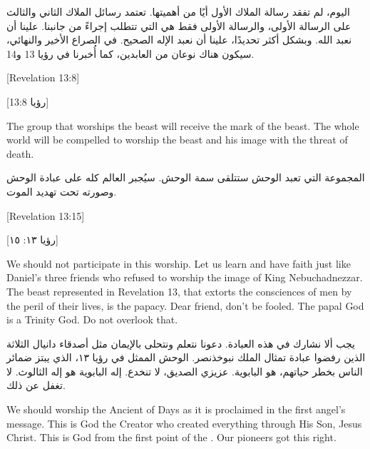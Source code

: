 اليوم، لم تفقد رسالة الملاك الأول أيًا من أهميتها. تعتمد رسائل الملاك الثاني والثالث على الرسالة الأولى، والرسالة الأولى فقط هي التي تتطلب إجراءً من جانبنا. علينا أن نعبد الله. وبشكل أكثر تحديدًا، علينا أن نعبد الإله الصحيح. في الصراع الأخير والنهائي، سيكون هناك نوعان من العابدين، كما أُخبرنا في رؤيا 13 و14.


[Revelation 13:8]


[رؤيا 13:8]


The group that worships the beast will receive the mark of the beast. The whole world will be compelled to worship the beast and his image with the threat of death.


المجموعة التي تعبد الوحش ستتلقى سمة الوحش. سيُجبر العالم كله على عبادة الوحش وصورته تحت تهديد الموت.


[Revelation 13:15]


[رؤيا ١٣: ١٥]


We should not participate in this worship. Let us learn and have faith just like Daniel’s three friends who refused to worship the image of King Nebuchadnezzar. The beast represented in Revelation 13, that extorts the consciences of men by the peril of their lives, is the papacy. Dear friend, don't be fooled. The papal God is a Trinity God. Do not overlook that.


يجب ألا نشارك في هذه العبادة. دعونا نتعلم ونتحلى بالإيمان مثل أصدقاء دانيال الثلاثة الذين رفضوا عبادة تمثال الملك نبوخذنصر. الوحش الممثل في رؤيا ١٣، الذي يبتز ضمائر الناس بخطر حياتهم، هو البابوية. عزيزي الصديق، لا تنخدع. إله البابوية هو إله الثالوث. لا تغفل عن ذلك.


We should worship the Ancient of Days as it is proclaimed in the first angel’s message. This is God the Creator who created everything through His Son, Jesus Christ. This is God from the first point of the . Our pioneers got this right.


